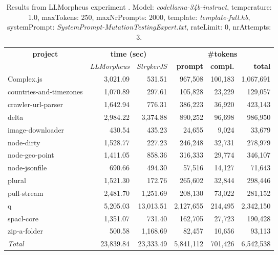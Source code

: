 
\begin{table*}[hbt!]
\centering
{\scriptsize
\begin{tabular}{l||r|r|r|r|r}
\multicolumn{1}{c|}{\bf project} & \multicolumn{2}{|c|}{\bf time (sec)} & \multicolumn{3}{|c|}{\bf \#tokens} \\
               & {\it LLMorpheus} & {\it StrykerJS} & {\bf prompt} & {\bf compl.} & {\bf total} \\
\hline
  Complex.js & 3,021.09 & 531.51 & 967,508 & 100,183 & 1,067,691 \\ 
countries-and-timezones & 1,070.89 & 297.61 & 105,828 & 23,229 & 129,057 \\ 
crawler-url-parser & 1,642.94 & 776.31 & 386,223 & 36,920 & 423,143 \\ 
delta & 2,984.22 & 3,374.88 & 890,252 & 96,698 & 986,950 \\ 
image-downloader & 430.54 & 435.23 & 24,655 & 9,024 & 33,679 \\ 
node-dirty & 1,528.77 & 227.23 & 246,248 & 32,731 & 278,979 \\ 
node-geo-point & 1,411.05 & 858.36 & 316,333 & 29,774 & 346,107 \\ 
node-jsonfile & 690.66 & 494.30 & 57,516 & 14,127 & 71,643 \\ 
plural & 1,521.30 & 172.76 & 265,602 & 32,844 & 298,446 \\ 
pull-stream & 2,481.70 & 1,251.69 & 208,130 & 73,022 & 281,152 \\ 
q & 5,205.03 & 13,013.51 & 2,127,655 & 214,495 & 2,342,150 \\ 
spacl-core & 1,351.07 & 731.40 & 162,705 & 27,723 & 190,428 \\ 
zip-a-folder & 500.58 & 1,168.69 & 82,457 & 10,656 & 93,113 \\ 
\hline
  \textit{Total} & 23,839.84 & 23,333.49 & 5,841,112 & 701,426 & 6,542,538 \\
  \end{tabular}
  }
  \\[2mm]
  \caption{Results from LLMorpheus experiment .
    Model: \textit{codellama-34b-instruct}, 
    temperature: 1.0, 
    maxTokens: 250, 
    maxNrPrompts: 2000, 
    template: \textit{template-full.hb}, 
    systemPrompt: \textit{SystemPrompt-MutationTestingExpert.txt}, 
    rateLimit: 0, 
    nrAttempts: 3.  
  }
  \label{table:Cost:run347:codellama-34b-instruct:template-full.hb:1.0}
\end{table*}